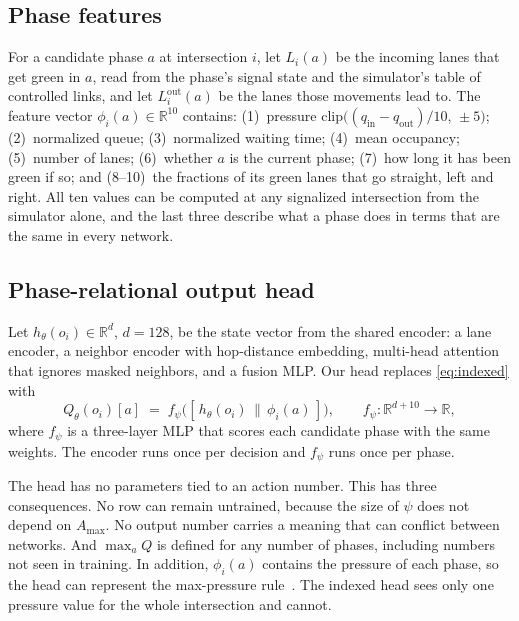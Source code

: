 \documentclass[conference]{IEEEtran}
\begin{document}
\subsection{Phase features}\label{sec:descriptors}
For a candidate phase $a$ at intersection $i$, let $L_i(a)$ be the incoming lanes that get
green in $a$, read from the phase's signal state and the simulator's table of controlled
links, and let $L^{\mathrm{out}}_i(a)$ be the lanes those movements lead to. The feature
vector $\phi_i(a)\in\mathbb{R}^{10}$ contains:
(1)~pressure $\mathrm{clip}\big((q_{\mathrm{in}}-q_{\mathrm{out}})/10,\,\pm5\big)$;
(2)~normalized queue; (3)~normalized waiting time; (4)~mean occupancy; (5)~number of
lanes; (6)~whether $a$ is the current phase; (7)~how long it has been green if so; and
(8--10)~the fractions of its green lanes that go straight, left and right. All ten values
can be computed at any signalized intersection from the simulator alone, and the last
three describe what a phase does in terms that are the same in every network.

\subsection{Phase-relational output head}
Let $h_\theta(o_i)\in\mathbb{R}^{d}$, $d=128$, be the state vector from the shared
encoder: a lane encoder, a neighbor encoder with hop-distance embedding, multi-head
attention that ignores masked neighbors, and a fusion MLP. Our head replaces
\eqref{eq:indexed} with
\begin{equation}
Q_\theta(o_i)[a] \;=\; f_\psi\!\big([\,h_\theta(o_i)\,\|\,\phi_i(a)\,]\big),
\qquad f_\psi:\mathbb{R}^{d+10}\!\rightarrow\!\mathbb{R},
\label{eq:phaserel}
\end{equation}
where $f_\psi$ is a three-layer MLP that scores each candidate phase with the same weights.
The encoder runs once per decision and $f_\psi$ runs once per phase.

The head has no parameters tied to an action number. This has three consequences. No
row can remain untrained, because the size of $\psi$ does not depend on $A_{\max}$. No
output number carries a meaning that can conflict between networks. And $\max_a Q$ is
defined for any number of phases, including numbers not seen in training. In addition,
$\phi_i(a)$ contains the pressure of each phase, so the head can represent the
max-pressure rule~\cite{varaiya}. The indexed head sees only one pressure value for the
whole intersection and cannot.
\end{document}
